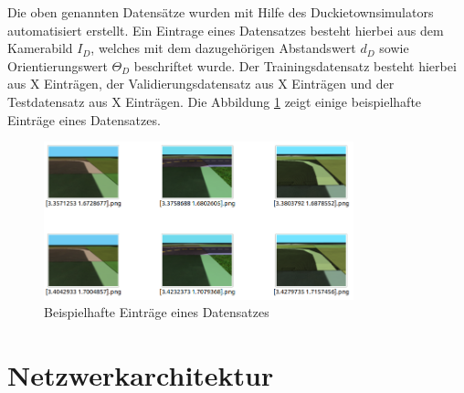 Die oben genannten Datensätze wurden mit Hilfe des Duckietownsimulators automatisiert erstellt. Ein Eintrage eines Datensatzes besteht hierbei aus dem Kamerabild $I_D$, welches mit dem dazugehörigen Abstandswert $d_D$ sowie Orientierungswert $\Theta_D$ beschriftet wurde. Der Trainingsdatensatz besteht hierbei aus X Einträgen, der Validierungsdatensatz aus X Einträgen und der Testdatensatz aus X Einträgen. Die Abbildung \ref{fig:data_entry_example} zeigt einige beispielhafte Einträge eines Datensatzes.

\begin{figure}[H]
	\centering
	\includegraphics[width=0.8\textwidth]{kapitel3/images/dataset_entries_example.png}
	\caption{Beispielhafte Einträge eines Datensatzes}
	\label{fig:data_entry_example}
\end{figure}


\section{Netzwerkarchitektur}



